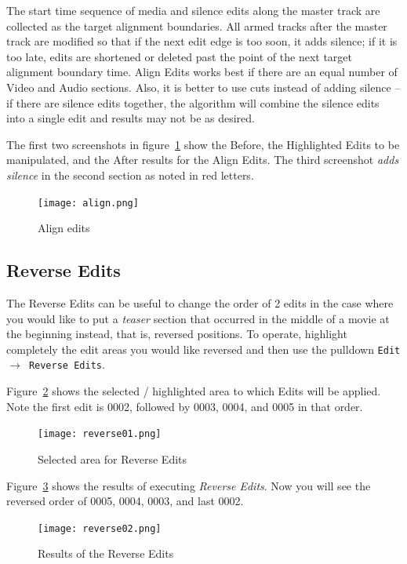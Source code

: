 The start time sequence of media and silence edits
along the master track are collected as the target alignment
boundaries. All armed tracks after the master track are modified so
that if the next edit edge is too soon, it adds silence; if it is
too late, edits are shortened or deleted past the point of the next
target alignment boundary time.  Align Edits works best if there are
an equal number of Video and Audio sections.  Also, it is better to
use cuts instead of adding silence -- if there are silence edits
together, the algorithm will combine the silence edits into a single
edit and results may not be as desired.

The first two screenshots in figure~\ref{fig:align} show the Before,
the Highlighted Edits to be manipulated, and the After results for
the Align Edits. The third screenshot \textit{adds silence} in the
second section as noted in red letters.

\begin{figure}[htpb] \centering
  \texttt{[image: align.png]}
  \caption{Align edits}
  \label{fig:align}
\end{figure}


\subsection{Reverse Edits}%
\label{sub:reverse_edits}

The Reverse Edits can be useful to change the order of 2 edits in
the case where you would like to put a \textit{teaser} section that
occurred in the middle of a movie at the beginning instead, that is,
reversed positions.  To operate, highlight completely the edit areas
you would like reversed and then use the pulldown \texttt{Edit
  $\rightarrow$ Reverse Edits}.

Figure~\ref{fig:reverse01} shows the selected / highlighted area to
which Edits will be applied.  Note the first edit is 0002, followed
by 0003, 0004, and 0005 in that order.

\begin{figure}[htpb]
  \centering
  \texttt{[image: reverse01.png]}
  \caption{Selected area for Reverse Edits}
  \label{fig:reverse01}
\end{figure}

Figure~\ref{fig:reverse02} shows the results of executing
\textit{Reverse Edits}.  Now you will see the reversed order of
0005, 0004, 0003, and last 0002.

\begin{figure}[htpb]
  \centering
  \texttt{[image: reverse02.png]}
  \caption{Results of the Reverse Edits}
  \label{fig:reverse02}
\end{figure}


